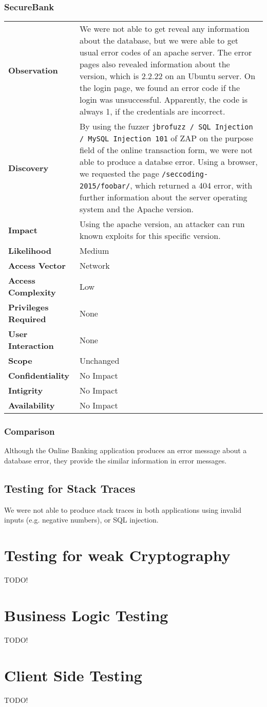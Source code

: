\subsubsection*{SecureBank}
\begin{tabular}{l|p{10cm}}

\textbf{Observation} & We were not able to get reveal any information about the database, but we were able to get usual error codes of an apache server. The error pages also revealed information about the version, which is 2.2.22 on an Ubuntu server. On the login page, we found an error code if the login was unsuccessful. Apparently, the code is always 1, if the credentials are incorrect. \\
\textbf{Discovery} & By using the fuzzer \texttt{jbrofuzz / SQL Injection / MySQL Injection 101} of ZAP on the purpose field of the online transaction form, we were not able to produce a databse error. Using a browser, we requested the page \texttt{/seccoding-2015/foobar/}, which returned a 404 error, with further information about the server operating system and the Apache version. \\
\textbf{Impact} & Using the apache version, an attacker can run known exploits for this specific version. \\
\textbf{Likelihood} & Medium \\
\textbf{Access Vector} & Network \\
\textbf{Access Complexity} & Low \\
\textbf{Privileges Required} & None \\
\textbf{User Interaction} & None \\
\textbf{Scope} & Unchanged \\
\textbf{Confidentiality} & No Impact \\
\textbf{Intigrity} & No Impact \\
\textbf{Availability} & No Impact \\
\end{tabular}

\subsubsection*{Comparison}
Although the Online Banking application produces an error message about a database error, they provide the similar information in error messages.

\subsection{Testing for Stack Traces}
We were not able to produce stack traces in both applications using invalid inputs (e.g. negative numbers), or SQL injection.

\section{Testing for weak Cryptography}
TODO!

\section{Business Logic Testing}
TODO!

\section{Client Side Testing}
TODO!

